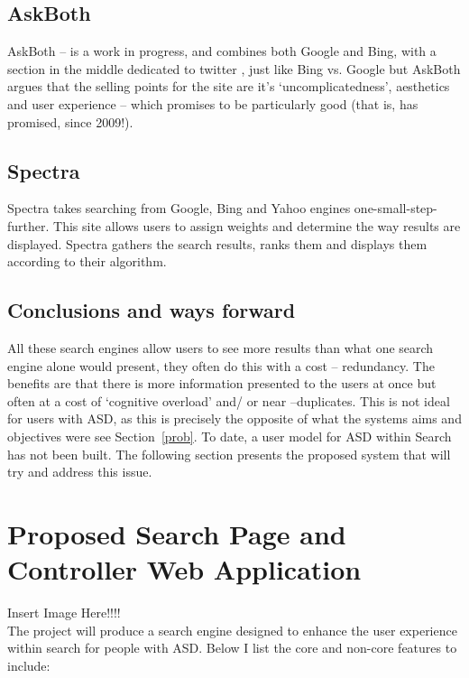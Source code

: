 \documentclass[10pt]{article}
\begin{document}
\subsection{AskBoth}
AskBoth – is a work in progress, and combines both Google and Bing, with a section in the middle dedicated to twitter , just like Bing vs. Google but AskBoth argues that the selling points for the site are it’s ‘uncomplicatedness’, aesthetics and user experience – which promises to be particularly good (that is, has promised, since 2009!).

\subsection{Spectra}
Spectra takes searching from Google, Bing and Yahoo engines one-small-step-further. This site allows users to assign weights and determine the way results are displayed. Spectra gathers the search results, ranks them and displays them according to their algorithm. 

\subsection{Conclusions and ways forward}
All these search engines allow users to see more results than what one search engine alone would present, they often do this with a cost -- redundancy. The benefits are that there is more information presented to the users at once but often at a cost of ‘cognitive overload’ and/ or near –duplicates. This is not ideal for users with ASD, as this is precisely the opposite of what the systems aims and objectives were see Section~\ref{prob}.
To date, a user model for ASD within Search has not been built. The following section presents the proposed system that will try and address this issue.


\section{Proposed Search Page and Controller Web Application}

Insert Image Here!!!!\\The project will produce a search engine designed to enhance the user experience within search for people with ASD. Below I list the core and non-core features to include:
\end{document}
